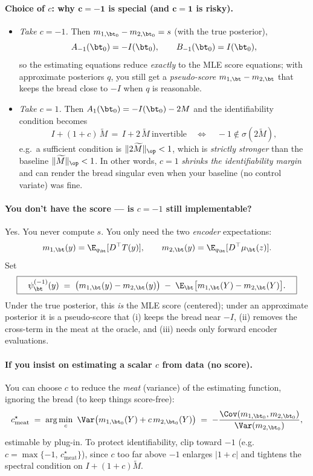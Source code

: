 \paragraph{Choice of \(c\): why \(\boldsymbol{c=-1}\) is special (and \(\boldsymbol{c=1}\) is risky).}
\begin{itemize}
\item \emph{Take \(c=-1\).} Then \(m_{1,\bt_0}-m_{2,\bt_0}=s\) (with the true posterior),
\[
A_{-1}(\bt_0)=-I(\bt_0),\qquad B_{-1}(\bt_0)=I(\bt_0),
\]
so the estimating equations reduce \emph{exactly} to the MLE score equations; with approximate posteriors \(q\), you still get a \emph{pseudo-score} \(m_{1,\bt}-m_{2,\bt}\) that keeps the bread close to \(-I\) when \(q\) is reasonable.
\item \emph{Take \(c=1\).} Then \(A_{1}(\bt_0)=-I(\bt_0)-2M\) and the identifiability condition becomes
\[
I+(1+c)\,\widetilde M\,=\,I+2\,\widetilde M\ \text{invertible}\quad\Longleftrightarrow\quad -1\notin\sigma(2\widetilde M),
\]
e.g.\ a sufficient condition is \(\|2\widetilde M\|_{\op}<1\), which is \emph{strictly stronger} than the baseline \(\|\widetilde M\|_{\op}<1\). In other words, \(c=1\) \emph{shrinks the identifiability margin} and can render the bread singular even when your baseline (no control variate) was fine.
\end{itemize}

\paragraph{You don’t have the score — is \(c=-1\) still implementable?}
Yes. You never compute \(s\). You only need the two \emph{encoder} expectations:
\[
m_{1,\bt}(y)=\E_{q_\bt}[D^\top T(y)],\qquad m_{2,\bt}(y)=\E_{q_\bt}[D^\top \mu_\bt(z)].
\]
Set
\[
\boxed{\quad \psi_\bt^{(-1)}(y)\;=\;\big(m_{1,\bt}(y)-m_{2,\bt}(y)\big)\;-\;\E_\bt\big[m_{1,\bt}(Y)-m_{2,\bt}(Y)\big].\quad}
\]
Under the true posterior, this \emph{is} the MLE score (centered); under an approximate posterior it is a pseudo-score that (i) keeps the bread near \(-I\), (ii) removes the cross-term in the meat at the oracle, and (iii) needs only forward encoder evaluations.

\paragraph{If you insist on estimating a scalar \(c\) from data (no score).}
You can choose \(c\) to reduce the \emph{meat} (variance) of the estimating function, ignoring the bread (to keep things score-free):
\[
c_{\text{meat}}^\star\;=\;\arg\min_c\ \Var\big(m_{1,\bt_0}(Y)+c\,m_{2,\bt_0}(Y)\big)
\;=\;-\frac{\Cov(m_{1,\bt_0},m_{2,\bt_0})}{\Var(m_{2,\bt_0})},
\]
estimable by plug-in. To protect identifiability, clip toward \(-1\) (e.g.\ \(c=\max\{-1,\,c_{\text{meat}}^\star\}\)), since \(c\) too far above \(-1\) enlarges \(|1+c|\) and tightens the spectral condition on \(I+(1+c)\widetilde M\).

